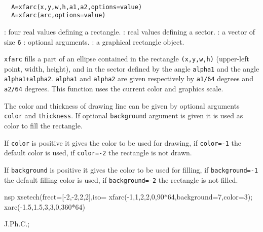 \begin{mandesc}
  \\ %
\end{mandesc}
\begin{calling_sequence}
\begin{verbatim}
  A=xfarc(x,y,w,h,a1,a2,options=value)
  A=xfarc(arc,options=value)
\end{verbatim}
\end{calling_sequence}
\begin{parameters}
  \begin{varlist}
    : four real values defining a rectangle.
    : real values defining a sector.
    : a vector of size \verb!6! 
    : optional arguments.
    : a graphical rectangle object.
  \end{varlist}
\end{parameters}

\begin{mandescription}
  \verb!xfarc! fills a part of an ellipse contained in the rectangle 
  \verb!(x,y,w,h)!
  (upper-left point, width, height), and in the sector defined by 
  the angle \verb!alpha1! and the angle \verb!alpha1+alpha2!. 
  \verb!alpha1! and \verb!alpha2! are 
  given respectively by \verb!a1/64! degrees and \verb!a2/64! degrees.
  This function uses the current color and graphics scale.

  The color and thickness of drawing line can be given by optional arguments
  \verb!color! and \verb!thickness!. If optional \verb!background!
  argument is given it is used as color to fill the rectangle.

  If \verb!color! is positive it gives the color to be used for drawing,
  if \verb!color=-1! the default color is used, if  \verb!color=-2! the
  rectangle is not drawn.

  If \verb!background! is positive it gives the color to be used for filling,
  if \verb!background=-1! the default filling color is used,
  if  \verb!background=-2! the rectangle is not filled.
  
\end{mandescription}

\begin{examples}
  \begin{mintednsp}{nsp}
    xsetech(frect=[-2,-2,2,2],iso=%
    xfarc(-1,1,2,2,0,90*64,background=7,color=3);
    xarc(-1.5,1.5,3,3,0,360*64)
  \end{mintednsp}
\end{examples}

\begin{manseealso}
     
\end{manseealso}


\begin{authors}
  J.Ph.C.;   

\end{authors}

